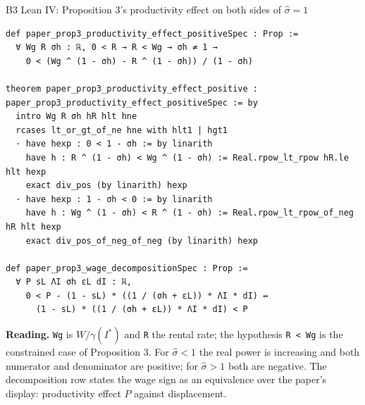 \documentclass[aspectratio=169,11pt]{beamer}
\begin{document}
\begin{frame}[fragile]{B3 \textperiodcentered{} Lean IV: Proposition 3's productivity effect on both sides of $\hat\sigma=1$}
  \scriptsize
  \begin{lstlisting}[basicstyle=\ttfamily\tiny]
def paper_prop3_productivity_effect_positiveSpec : Prop :=
  ∀ Wg R σh : ℝ, 0 < R → R < Wg → σh ≠ 1 →
    0 < (Wg ^ (1 - σh) - R ^ (1 - σh)) / (1 - σh)

theorem paper_prop3_productivity_effect_positive : paper_prop3_productivity_effect_positiveSpec := by
  intro Wg R σh hR hlt hne
  rcases lt_or_gt_of_ne hne with hlt1 | hgt1
  · have hexp : 0 < 1 - σh := by linarith
    have h : R ^ (1 - σh) < Wg ^ (1 - σh) := Real.rpow_lt_rpow hR.le hlt hexp
    exact div_pos (by linarith) hexp
  · have hexp : 1 - σh < 0 := by linarith
    have h : Wg ^ (1 - σh) < R ^ (1 - σh) := Real.rpow_lt_rpow_of_neg hR hlt hexp
    exact div_pos_of_neg_of_neg (by linarith) hexp

def paper_prop3_wage_decompositionSpec : Prop :=
  ∀ P sL ΛI σh εL dI : ℝ,
    0 < P - (1 - sL) * ((1 / (σh + εL)) * ΛI * dI) ↔
      (1 - sL) * ((1 / (σh + εL)) * ΛI * dI) < P
  \end{lstlisting}
  \textbf{Reading.} \texttt{Wg} is $W/\gamma(I^*)$ and \texttt{R} the rental rate; the hypothesis \texttt{R < Wg} is the
  constrained case of Proposition 3. For $\hat\sigma<1$ the real power is increasing and both numerator and
  denominator are positive; for $\hat\sigma>1$ both are negative. The decomposition row states the wage sign as an
  equivalence over the paper's display: productivity effect $P$ against displacement.
\end{frame}
\end{document}
